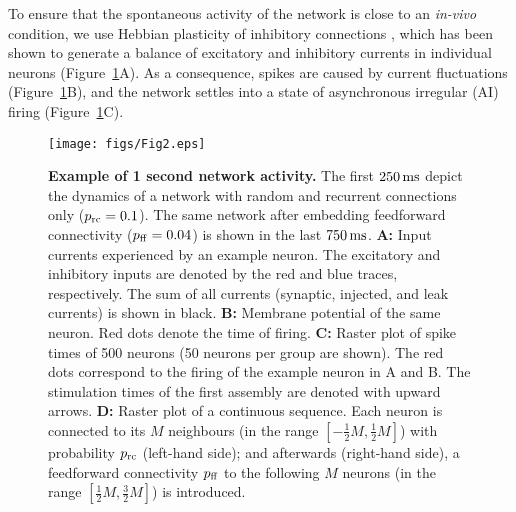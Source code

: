   To ensure that the spontaneous activity of the network is close to an
  \textit{in-vivo} condition, we use Hebbian plasticity of inhibitory
  connections \citep{Vogels2011}, which has been shown to generate a balance of
  excitatory and inhibitory currents in individual neurons (Figure~\ref{fig2}A).
  As a consequence, spikes are caused by current fluctuations
  (Figure~\ref{fig2}B), and the network settles into a state of asynchronous
  irregular (AI) firing (Figure~\ref{fig2}C).

  \begin{figure}[!h]
      \center
    \texttt{[image: figs/Fig2.eps]}
    \caption{{\bf Example of 1 second network activity.} The first $250 \,\rm
      ms$ depict the dynamics of a network with random and recurrent
      connections only ($p_{\rm rc} = 0.1$). The same network after embedding
      feedforward connectivity ($p_{\rm ff} = 0.04$) is shown in the last $750
      \,\rm ms$.
      \textbf{A:} Input currents experienced by an example neuron. The
      excitatory and inhibitory inputs are denoted by the red and blue traces,
      respectively. The sum of all currents (synaptic, injected, and leak
      currents) is shown in black.
      \textbf{B:} Membrane potential of the same neuron. Red dots denote
      the time of firing.
      \textbf{C:} Raster plot of spike times of 500 neurons (50 neurons per
      group are shown). The red dots correspond to the firing of the example
      neuron in A and B. The stimulation times of the first assembly are
      denoted with upward arrows.
      \textbf{D:} Raster plot of a continuous sequence. Each neuron is
      connected to its $M$ neighbours (in the range $[-\frac{1}{2}M, \frac{1}{2}M]$) with probability $p_{\rm rc}$ (left-hand
      side); and afterwards (right-hand side), a feedforward connectivity $p_{\rm ff}$ to the
      following $M$ neurons (in the range $[\frac{1}{2}M, \frac{3}{2}M]$) is
      introduced.
      }
    \label{fig2}
  \end{figure}

